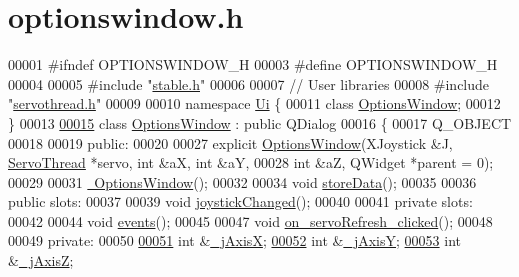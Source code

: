 \hypertarget{a00018_source}{}\section{optionswindow.\+h}

\begin{DoxyCode}
00001 \textcolor{preprocessor}{#ifndef OPTIONSWINDOW\_H}
00003 \textcolor{preprocessor}{#define OPTIONSWINDOW\_H}
00004 
00005 \textcolor{preprocessor}{#include "\hyperlink{a00021}{stable.h}"}
00006 
00007 \textcolor{comment}{// User libraries}
00008 \textcolor{preprocessor}{#include "\hyperlink{a00020}{servothread.h}"}
00009 
00010 \textcolor{keyword}{namespace }\hyperlink{a00023}{Ui} \{
00011 \textcolor{keyword}{class }\hyperlink{a00005}{OptionsWindow};
00012 \}
00013 
\hypertarget{a00018_source_l00015}{}\hyperlink{a00005}{00015} \textcolor{keyword}{class }\hyperlink{a00005}{OptionsWindow} : \textcolor{keyword}{public} QDialog
00016 \{
00017     Q\_OBJECT
00018     
00019 \textcolor{keyword}{public}:
00020     
00027     \textcolor{keyword}{explicit} \hyperlink{a00005_a968da93eec85561ebdb3a464eff15611}{OptionsWindow}(XJoystick &J, \hyperlink{a00007}{ServoThread} *servo, \textcolor{keywordtype}{int} &aX, \textcolor{keywordtype}{int} &aY, 
00028                            \textcolor{keywordtype}{int} &aZ, QWidget *parent = 0);
00029     
00031     \hyperlink{a00005_a034c885fe8bb4416e732a9571d14a6b4}{~OptionsWindow}();
00032     
00034     \textcolor{keywordtype}{void} \hyperlink{a00005_ab0a56ad7347c20046602a7a2a1c83397}{storeData}();
00035     
00036 \textcolor{keyword}{public} slots:
00037     
00039     \textcolor{keywordtype}{void} \hyperlink{a00005_ae8c0373be58da710194f8d14f1c3c4dc}{joystickChanged}();
00040 
00041 \textcolor{keyword}{private} slots:
00042     
00044     \textcolor{keywordtype}{void} \hyperlink{a00005_a18763ff318688083c7ee5a21f22e8e98}{events}();
00045     
00047     \textcolor{keywordtype}{void} \hyperlink{a00005_ad5365d452e8bcd86cbb64b9ec42c3b7e}{on\_servoRefresh\_clicked}();
00048     
00049 \textcolor{keyword}{private}:
00050     
\hypertarget{a00018_source_l00051}{}\hyperlink{a00005_a01d6284355011203ee6e8856a0bdf557}{00051}     \textcolor{keywordtype}{int} &\hyperlink{a00005_a01d6284355011203ee6e8856a0bdf557}{\_jAxisX};   
\hypertarget{a00018_source_l00052}{}\hyperlink{a00005_a8921d1cc5bcb527466c28feb5dcc59b1}{00052}     \textcolor{keywordtype}{int} &\hyperlink{a00005_a8921d1cc5bcb527466c28feb5dcc59b1}{\_jAxisY};   
\hypertarget{a00018_source_l00053}{}\hyperlink{a00005_a47409f50a87942706baaea3d025785e3}{00053}     \textcolor{keywordtype}{int} &\hyperlink{a00005_a47409f50a87942706baaea3d025785e3}{\_jAxisZ};   

\end{DoxyCode}
